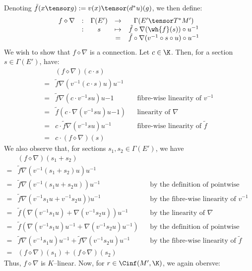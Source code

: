 Denoting $\tilde{f}(x \tensor g) := v(x) \tensor (d^*u)(g)$, we then define:
\[\begin{array}{ccccc}
f \diamond \nabla
&:& \Gamma(E') &\to    & \Gamma(E' \tensor T^*M') \\
&:& s &\mapsto& \tilde{f} \circ \nabla(\wh{f}(s)) \circ u^{-1} \\
&&& = &
  \tilde{f} \circ \nabla(v^{-1} \circ s \circ u) \circ u^{-1}
\end{array}\]
We wish to show that $f \diamond \nabla$ is a connection.
Let $c \in \K$. Then, for a section $s \in \Gamma(E')$, have:
\begin{align*}
   & (f \diamond \nabla)(c \cdot s) \\
  =& \tilde{f}\nabla(v^{-1}(c \cdot s)u)u^{-1} \\
  =& \tilde{f}\nabla(c \cdot v^{-1}su)u{-1}
      && \text{fibre-wise linearity of } v^{-1} \\
  =& \tilde{f} (c \cdot  \nabla(v^{-1}su)u{-1})
      && \text{linearity of } \nabla \\
  =& c \cdot \tilde{f}\nabla(v^{-1}su)u^{-1}
      && \text{fibre-wise linearity of } \tilde{f} \\
  =& c \cdot (f \diamond \nabla)(s)
\end{align*}
We also observe that, for sections $s_1, s_2 \in \Gamma(E')$, we have
\begin{align*}
   & (f \diamond \nabla)(s_1 + s_2)\\
  =& \tilde{f}\nabla(v^{-1}(s_1 + s_2)u)u^{-1} \\
  =& \tilde{f}\nabla(v^{-1}(s_1u + s_2u))u^{-1}
    && \text{by the definition of pointwise addition} \\
  =& \tilde{f}\nabla(v^{-1}s_1u + v^{-1}s_2u))u^{-1}
    && \text{by the fibre-wise linearity of } v^{-1} \\
  =& \tilde{f}(\nabla(v^{-1}s_1u)
    + \nabla(v^{-1}s_2u))u^{-1}
    && \text{by the linearity of } \nabla \\
  =& \tilde{f}(\nabla(v^{-1}s_1u)u^{-1}
    + \nabla(v^{-1}s_2u)u^{-1})
    && \text{by the definition of pointwise addition} \\
  =& \tilde{f}\nabla(v^{-1}s_1u)u^{-1}
    + \tilde{f}\nabla(v^{-1}s_2u)u^{-1}
    && \text{by the fibre-wise linearity of } \tilde{f} \\
  =& (f \diamond \nabla)(s_1) + (f \diamond \nabla)(s_2)
\end{align*}
Thus, $f \diamond \nabla$ is $K$--linear. Now, for $r \in \Cinf(M', \K)$, we
again obersve:
